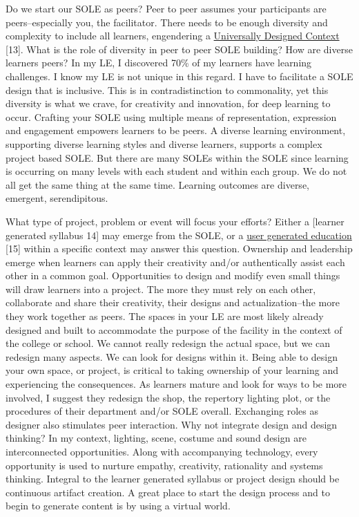 Do we start our SOLE as peers? Peer to peer assumes your participants
are peers--especially you, the facilitator. There needs to be enough
diversity and complexity to include all learners, engendering a
\href{http://www.cast.org/library/UDLguidelines/}{Universally Designed
Context} {{[}13{]}}. What is the role of diversity in peer to peer SOLE
building? How are diverse learners peers? In my LE, I discovered 70\% of
my learners have learning challenges. I know my LE is not unique in this
regard. I have to facilitate a SOLE design that is inclusive. This is in
contradistinction to commonality, yet this diversity is what we crave,
for creativity and innovation, for deep learning to occur. Crafting your
SOLE using multiple means of representation, expression and engagement
empowers learners to be peers. A diverse learning environment,
supporting diverse learning styles and diverse learners, supports a
complex project based SOLE. But there are many SOLEs within the SOLE
since learning is occurring on many levels with each student and within
each group. We do not all get the same thing at the same time. Learning
outcomes are diverse, emergent, serendipitous.

What type of project, problem or event will focus your efforts? Either a
{[}learner generated syllabus
\href{http://www.theatreprof.com/2011/active-learning-student-generated-syllabus/}{}14{]}
may emerge from the SOLE, or a
\href{http://usergeneratededucation.wordpress.com/}{user generated
education} {{[}15{]}} within a specific context may answer this
question. Ownership and leadership emerge when learners can apply their
creativity and/or authentically assist each other in a common goal.
Opportunities to design and modify even small things will draw learners
into a project. The more they must rely on each other, collaborate and
share their creativity, their designs and actualization--the more they
work together as peers. The spaces in your LE are most likely already
designed and built to accommodate the purpose of the facility in the
context of the college or school. We cannot really redesign the actual
space, but we can redesign many aspects. We can look for designs within
it. Being able to design your own space, or project, is critical to
taking ownership of your learning and experiencing the consequences. As
learners mature and look for ways to be more involved, I suggest they
redesign the shop, the repertory lighting plot, or the procedures of
their department and/or SOLE overall. Exchanging roles as designer also
stimulates peer interaction. Why not integrate design and design
thinking? In my context, lighting, scene, costume and sound design are
interconnected opportunities. Along with accompanying technology, every
opportunity is used to nurture empathy, creativity, rationality and
systems thinking. Integral to the learner generated syllabus or project
design should be continuous artifact creation. A great place to start
the design process and to begin to generate content is by using a
virtual world.

